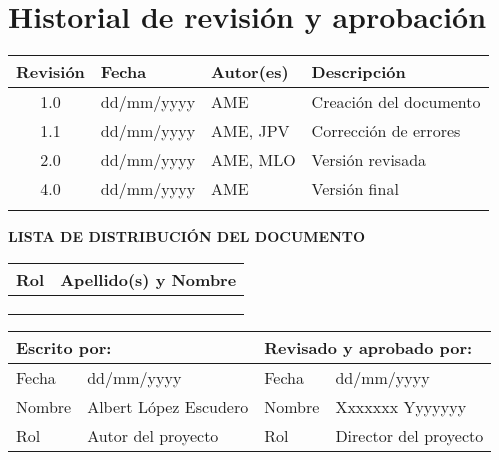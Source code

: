 \vspace*{0cm}

\chapter*{Historial de revisión y aprobación}

\begin{tabularx}{\textwidth}{|c|l|l|X|}
  \hline
    \textbf{Revisión} & \textbf{Fecha} & \textbf{Autor(es)} & \textbf{Descripción} \\
  \hline
    1.0 & dd/mm/yyyy & AME & Creación del documento \\
  \hline
    1.1 & dd/mm/yyyy & AME, JPV & Corrección de errores \\
  \hline
    2.0 & dd/mm/yyyy & AME, MLO & Versión revisada \\
  \hline
    4.0 & dd/mm/yyyy & AME & Versión final \\
  \hline
    & & & \\
  \hline
\end{tabularx}

\vspace{1cm}

\textbf{LISTA DE DISTRIBUCIÓN DEL DOCUMENTO}

\begin{tabularx}{\textwidth}{|l|X|}
  \hline
    \textbf{Rol} & \textbf{Apellido(s) y Nombre} \\
  \hline
    [Estudiante] &  \\
  \hline
    [Director del proyecto] &  \\
  \hline
    [Director 2 (sólo si aplica)] &  \\
  \hline
\end{tabularx}

\vspace{1cm}

\begin{tabularx}{\textwidth}{|l|X||l|X|}
  \hline
    \multicolumn{2}{|l||}{\textbf{Escrito por:}}  &  \multicolumn{2}{l|}{\textbf{Revisado y aprobado por:}} \\
  \hline
    Fecha &  dd/mm/yyyy & Fecha &  dd/mm/yyyy \\
  \hline
    Nombre &  Albert López Escudero & Nombre &  Xxxxxxx Yyyyyyy \\
  \hline
    Rol & Autor del proyecto & Rol & Director del proyecto \\
  \hline
\end{tabularx}

